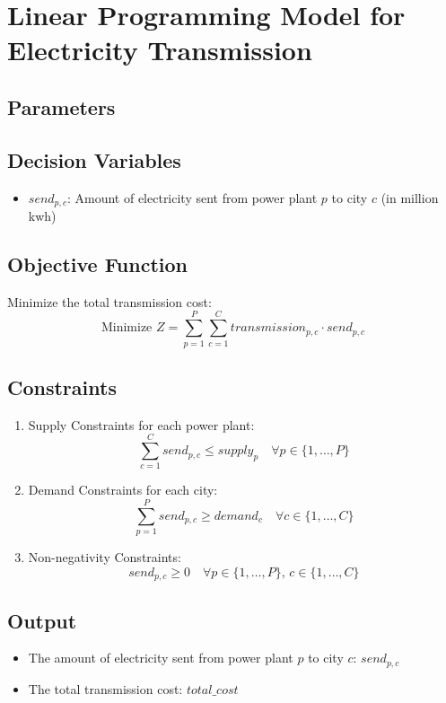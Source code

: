 \documentclass{article}
\begin{document}
\section*{Linear Programming Model for Electricity Transmission}

\subsection*{Parameters}

\subsection*{Decision Variables}
\begin{itemize}
    \item $send_{p,c}$: Amount of electricity sent from power plant $p$ to city $c$ (in million kwh)
\end{itemize}

\subsection*{Objective Function}
Minimize the total transmission cost:
\[
\text{Minimize } Z = \sum_{p=1}^{P} \sum_{c=1}^{C} transmission_{p,c} \cdot send_{p,c}
\]

\subsection*{Constraints}
\begin{enumerate}
    \item Supply Constraints for each power plant:
    \[
    \sum_{c=1}^{C} send_{p,c} \leq supply_{p} \quad \forall p \in \{1, \ldots, P\}
    \]
    
    \item Demand Constraints for each city:
    \[
    \sum_{p=1}^{P} send_{p,c} \geq demand_{c} \quad \forall c \in \{1, \ldots, C\}
    \]
    
    \item Non-negativity Constraints:
    \[
    send_{p,c} \geq 0 \quad \forall p \in \{1, \ldots, P\}, \, c \in \{1, \ldots, C\}
    \]
\end{enumerate}

\subsection*{Output}
\begin{itemize}
    \item The amount of electricity sent from power plant $p$ to city $c$: $send_{p,c}$
    \item The total transmission cost: $total\_cost$
\end{itemize}
\end{document}
